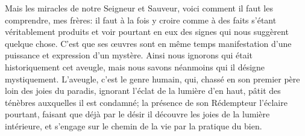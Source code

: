 Mais les miracles de notre Seigneur et Sauveur,
	voici comment il faut les comprendre, mes frères:
	il faut à la fois y croire comme à des faits s'étant véritablement produits
	et voir pourtant en eux des signes qui nous suggèrent quelque chose.
C'est que ses œuvres sont en même temps manifestation d'une puissance
		et expression d'un mystère.
Ainsi nous ignorons qui était historiquement cet aveugle,
	mais nous savons néanmoins qui il désigne mystiquement.
L'aveugle, c'est le genre humain,
	qui, chassé en son premier père loin des joies du paradis,
	ignorant l'éclat de la lumière d'en haut,
	pâtit des ténèbres auxquelles il est condamné;
	la présence de son Rédempteur l'éclaire pourtant,
	faisant que déjà par le désir il découvre les joies de la lumière intérieure,
	et s'engage sur le chemin de la vie par la pratique du bien.
